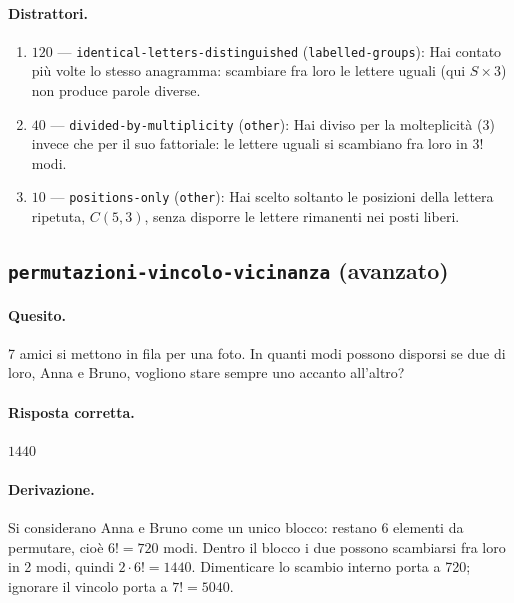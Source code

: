 \paragraph{Distrattori.}
\begin{enumerate}
  \item $120$ --- \texttt{identical-letters-distinguished} (\texttt{labelled-groups}): Hai contato più volte lo stesso anagramma: scambiare fra loro le lettere uguali (qui $S\times 3$) non produce parole diverse.
  \item $40$ --- \texttt{divided-by-multiplicity} (\texttt{other}): Hai diviso per la molteplicità (3) invece che per il suo fattoriale: le lettere uguali si scambiano fra loro in $3!$ modi.
  \item $10$ --- \texttt{positions-only} (\texttt{other}): Hai scelto soltanto le posizioni della lettera ripetuta, $C(5,3)$, senza disporre le lettere rimanenti nei posti liberi.
\end{enumerate}

\subsection{\texorpdfstring{\texttt{permutazioni-vincolo-vicinanza} (avanzato)}{permutazioni-vincolo-vicinanza (avanzato)}}

\paragraph{Quesito.} 7 amici si mettono in fila per una foto. In quanti modi possono disporsi se due di loro, Anna e Bruno, vogliono stare sempre uno accanto all'altro?

\paragraph{Risposta corretta.} $1440$

\paragraph{Derivazione.} Si considerano Anna e Bruno come un unico blocco: restano 6 elementi da permutare, cioè $6! = 720$ modi. Dentro il blocco i due possono scambiarsi fra loro in 2 modi, quindi $2 \cdot  6! = 1440$. Dimenticare lo scambio interno porta a 720; ignorare il vincolo porta a $7! = 5040$.

